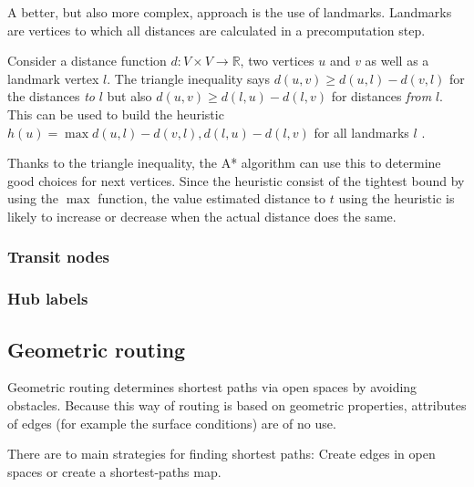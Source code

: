 			A better, but also more complex, approach is the use of landmarks.
			Landmarks are vertices to which all distances are calculated in a precomputation step.
			
			Consider a distance function $d : V \times V \rightarrow \mathbb{R}$, two vertices $u$ and $v$ as well as a landmark vertex $l$.
			The triangle inequality says $d(u,v) \geq d(u,l) - d(v,l)$ for the distances \emph{to} $l$ but also $d(u,v) \geq d(l,u) - d(l,v)$ for distances \emph{from} $l$.
			This can be used to build the heuristic $h(u) = \max{d(u,l)-d(v,l), d(l,u)-d(l,v)}$ for all landmarks $l$ \cite[6-7]{goldberg-landmarks}.
			
			Thanks to the triangle inequality, the A* algorithm can use this to determine good choices for next vertices.
			Since the heuristic consist of the tightest bound by using the $\max$ function, the value estimated distance to $t$ using the heuristic is likely to increase or decrease when the actual distance does the same.
		
		\subsubsection{Transit nodes}
		
		\subsubsection{Hub labels}
	
	\subsection{Geometric routing}
	\label{subsec:geometric-routing}
	
		Geometric routing determines shortest paths via open spaces by avoiding obstacles.
		Because this way of routing is based on geometric properties, attributes of edges (for example the surface conditions) are of no use.
		
		
		There are to main strategies for finding shortest paths:
		Create edges in open spaces or create a shortest-paths map.
		
